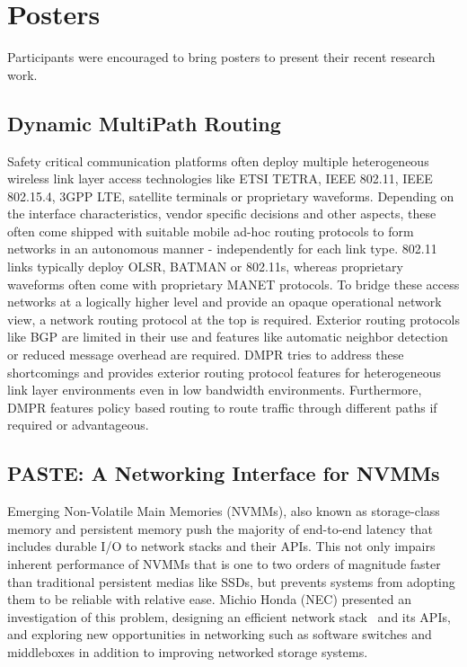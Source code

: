 \section{Posters}\label{sec:posters}

Participants were encouraged to bring posters to present
their recent research work.

\subsection{Dynamic MultiPath Routing}

Safety critical communication platforms often deploy multiple heterogeneous
wireless link layer access technologies like ETSI TETRA, IEEE 802.11, IEEE
802.15.4, 3GPP LTE, satellite terminals or proprietary waveforms.  Depending
on the interface characteristics, vendor specific decisions and other aspects,
these often come shipped with suitable mobile ad-hoc routing protocols to form
networks in an autonomous manner - independently for each link type. 802.11
links typically deploy OLSR, BATMAN or 802.11s, whereas proprietary waveforms
often come with proprietary MANET protocols.  To bridge these access networks
at a logically higher level and provide an opaque operational network view, a
network routing protocol at the top is required. Exterior routing protocols
like BGP are limited in their use and features like automatic neighbor
detection or reduced message overhead are required. \ac{DMPR} tries to address
these shortcomings and provides exterior routing protocol features for
heterogeneous link layer environments even in low bandwidth environments.
Furthermore, \ac{DMPR} features policy based routing to route traffic through
different paths if required or advantageous.

\subsection{PASTE: A Networking Interface for NVMMs}

Emerging Non-Volatile Main Memories (NVMMs), also known as storage-class
memory and persistent memory  push the majority of end-to-end latency that
includes durable I/O to network stacks and their APIs.  This not only impairs
inherent performance of NVMMs that is one to two orders of magnitude faster
than traditional persistent medias like SSDs, but prevents systems from
adopting them to be reliable with relative ease. Michio Honda (NEC) presented
an investigation of this problem, designing an efficient network
stack~\cite{mhonda:hotnets:2016} and its APIs, and exploring new opportunities
in networking such as software switches and middleboxes in addition to
improving networked storage systems.

